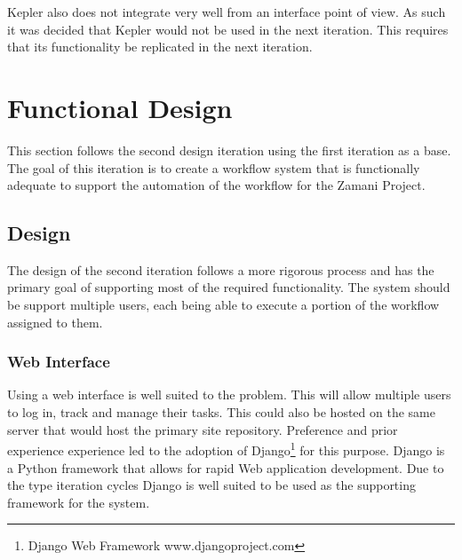 \documentclass[12pt,a4paper]{report}
\begin{document}
Kepler also does not integrate very well from an interface point of view.
As such it was decided that Kepler would not be used in the next iteration. This
requires that its functionality be replicated in the next iteration.

\section{Functional Design\label{iteration2}}
This section follows the second design iteration using the first iteration
as a base. The goal of this iteration is to create a workflow system that is
functionally adequate to support the automation of the workflow for the Zamani
Project.

\subsection{Design}
The design of the second iteration follows a more rigorous process and has the
primary goal of supporting most of the required functionality. The system should
be support multiple users, each being able to execute a portion of the workflow
assigned to them.
\subsubsection{Web Interface}
Using a web interface is well suited to the problem. This will allow multiple
users to log in, track and manage their tasks. This could also be hosted on the
same server that would host the primary site repository. Preference and prior
experience experience led to the adoption of Django\footnote{Django Web Framework
www.djangoproject.com} for this purpose. Django is a Python framework that allows
for rapid Web application development. Due to the type iteration cycles Django is
well suited to be used as the supporting framework for the system.
\end{document}
